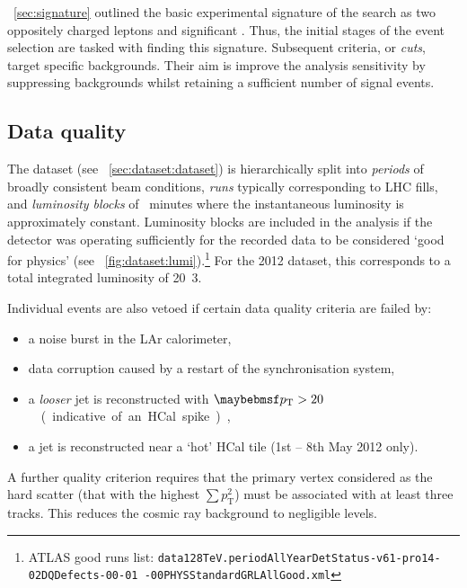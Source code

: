 
\Section~\ref{sec:signature} outlined the basic experimental signature of the search as 
two oppositely charged leptons and significant \met. Thus, the initial stages of the 
event selection are tasked with finding this signature. Subsequent criteria, or 
\textit{cuts}, target specific backgrounds. Their aim is improve the analysis sensitivity 
by suppressing backgrounds whilst retaining a sufficient number of signal events.



\subsection{Data quality}
\label{sec:selection:quality}

The \pp dataset (see \Section~\ref{sec:dataset:dataset}) is hierarchically split into 
\textit{periods} of broadly consistent beam conditions, \textit{runs} typically 
corresponding to LHC fills, and \textit{luminosity blocks} of ~minutes where the 
instantaneous luminosity is approximately constant. Luminosity blocks are included in the 
analysis if the detector was operating sufficiently for the recorded data to be 
considered `good for physics' (see \Figure~\ref{fig:dataset:lumi}).\footnote{
	ATLAS good runs list: \texttt{data128TeV.periodAllYearDetStatus-v61-pro14-02DQDefects-00-01
	-00PHYSStandardGRLAllGood.xml}
} 
For the 2012 dataset, this corresponds to a total integrated luminosity of 
\unit{20.3}{\invfb}.

Individual events are also vetoed if certain data quality criteria are failed by:
\begin{itemize}[noitemsep,nolistsep]
	\item a noise burst in the LAr calorimeter,
	\item data corruption caused by a restart of the synchronisation system,
	\item a \textit{looser} jet is reconstructed with \unit{$\pt > 20$}{\GeV} (indicative 
	of an HCal spike),
	\item a jet is reconstructed near a `hot' HCal tile (1st -- 8th May 2012 only).
\end{itemize}
A further quality criterion requires that the primary vertex considered as the hard 
scatter (that with the highest $\sum p_{\text{T}}^2$) must be associated with at least 
three tracks. This reduces the cosmic ray background to negligible levels.



